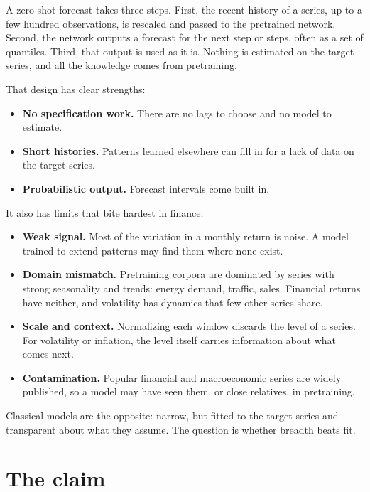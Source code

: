 A zero-shot forecast takes three steps. First, the recent history of a series, up to a few hundred observations, is rescaled and passed to the pretrained network. Second, the network outputs a forecast for the next step or steps, often as a set of quantiles. Third, that output is used as it is. Nothing is estimated on the target series, and all the knowledge comes from pretraining.

That design has clear strengths:

\begin{itemize}
  \item \textbf{No specification work.} There are no lags to choose and no model to estimate.
  \item \textbf{Short histories.} Patterns learned elsewhere can fill in for a lack of data on the target series.
  \item \textbf{Probabilistic output.} Forecast intervals come built in.
\end{itemize}

It also has limits that bite hardest in finance:

\begin{itemize}
  \item \textbf{Weak signal.} Most of the variation in a monthly return is noise. A model trained to extend patterns may find them where none exist.
  \item \textbf{Domain mismatch.} Pretraining corpora are dominated by series with strong seasonality and trends: energy demand, traffic, sales. Financial returns have neither, and volatility has dynamics that few other series share.
  \item \textbf{Scale and context.} Normalizing each window discards the level of a series. For volatility or inflation, the level itself carries information about what comes next.
  \item \textbf{Contamination.} Popular financial and macroeconomic series are widely published, so a model may have seen them, or close relatives, in pretraining.
\end{itemize}

Classical models are the opposite: narrow, but fitted to the target series and transparent about what they assume. The question is whether breadth beats fit.

\section{The claim}
\label{sec:21-claim}

